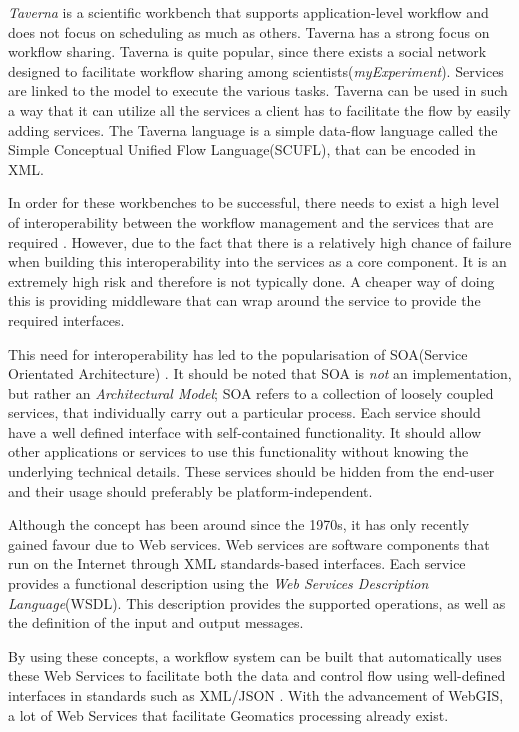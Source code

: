     \emph{Taverna} is a scientific workbench that supports application-level
workflow and does not focus on scheduling as much as others\cite{4721191}. Taverna
has a strong focus on workflow sharing. Taverna is quite popular, since there
exists a social network designed to facilitate workflow sharing among
scientists(\emph{myExperiment}). Services are linked to the model to execute
the various tasks. Taverna can be used in such a way that it can utilize all
the services a client has to facilitate the flow by easily adding services. The
Taverna language is a simple data-flow language called the Simple Conceptual
Unified Flow Language(SCUFL), that can be encoded in XML.

In order for these workbenches to be successful, there needs to exist a
high level of interoperability between the workflow management and the services
that are required \cite{Shegalov:2001:XWM:767132.767139}.  However, due to the
fact that there is a relatively high chance of failure when building this
interoperability into the services as a core component. It is an extremely high
risk and therefore is not typically done. A cheaper way of doing this is
providing middleware that can wrap around the service to provide the required
interfaces.

This need for interoperability has led to the popularisation of SOA(Service
Orientated Architecture) \cite{Sanders:2008:SSA:1400549.1400595}.  It should be
noted that SOA is \emph{not} an implementation, but rather an
\emph{Architectural Model}; SOA refers to a collection of loosely coupled
services, that individually carry out a particular process. Each service should
have a well defined interface with self-contained functionality. It should
allow other applications or services to use this functionality without knowing
the underlying technical details. These services should be hidden from the
end-user and their usage should preferably be platform-independent.

Although the concept has been around since the 1970s, it has only recently
gained favour due to Web services.  Web services are software components that run on the
Internet through XML standards-based
interfaces\cite{Tai:2004:CCW:1045658.1045680}.  Each service provides a
functional description using the \emph{Web Services Description Language}(WSDL).
This description provides the supported operations, as well as the definition
of the input and output messages.

By using these concepts, a workflow system can be built that automatically uses
these Web Services to facilitate both the data and control flow using well-defined
interfaces in standards such as XML/JSON \cite{Shegalov:2001:XWM:767132.767139}. 
With the advancement of WebGIS, a lot
of Web Services that facilitate Geomatics processing already exist.


